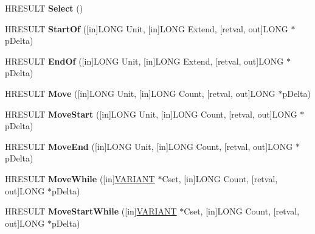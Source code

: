 \begin{DoxyCompactItemize}
\item 
\mbox{\label{interface_i_text_range_abad39848f520cadc0b1e8588868745be}} 
H\+R\+E\+S\+U\+LT {\bfseries Select} ()
\item 
\mbox{\label{interface_i_text_range_a5ff12f1aa1308857f0702a6360b9f11b}} 
H\+R\+E\+S\+U\+LT {\bfseries Start\+Of} (\mbox{[}in\mbox{]}L\+O\+NG Unit, \mbox{[}in\mbox{]}L\+O\+NG Extend, \mbox{[}retval, out\mbox{]}L\+O\+NG $\ast$p\+Delta)
\item 
\mbox{\label{interface_i_text_range_a61b79a35868811004023dd834ff69555}} 
H\+R\+E\+S\+U\+LT {\bfseries End\+Of} (\mbox{[}in\mbox{]}L\+O\+NG Unit, \mbox{[}in\mbox{]}L\+O\+NG Extend, \mbox{[}retval, out\mbox{]}L\+O\+NG $\ast$p\+Delta)
\item 
\mbox{\label{interface_i_text_range_ab5536fe2f6004e37dafb874dbf12096c}} 
H\+R\+E\+S\+U\+LT {\bfseries Move} (\mbox{[}in\mbox{]}L\+O\+NG Unit, \mbox{[}in\mbox{]}L\+O\+NG Count, \mbox{[}retval, out\mbox{]}L\+O\+NG $\ast$p\+Delta)
\item 
\mbox{\label{interface_i_text_range_a990cfe77a6ddc5eaefb55766029d8cc8}} 
H\+R\+E\+S\+U\+LT {\bfseries Move\+Start} (\mbox{[}in\mbox{]}L\+O\+NG Unit, \mbox{[}in\mbox{]}L\+O\+NG Count, \mbox{[}retval, out\mbox{]}L\+O\+NG $\ast$p\+Delta)
\item 
\mbox{\label{interface_i_text_range_a536339da524fc374ce25d9b544e64824}} 
H\+R\+E\+S\+U\+LT {\bfseries Move\+End} (\mbox{[}in\mbox{]}L\+O\+NG Unit, \mbox{[}in\mbox{]}L\+O\+NG Count, \mbox{[}retval, out\mbox{]}L\+O\+NG $\ast$p\+Delta)
\item 
\mbox{\label{interface_i_text_range_a14c433030446898941c0e364f0e78d3d}} 
H\+R\+E\+S\+U\+LT {\bfseries Move\+While} (\mbox{[}in\mbox{]}\hyperlink{structtag_v_a_r_i_a_n_t}{V\+A\+R\+I\+A\+NT} $\ast$Cset, \mbox{[}in\mbox{]}L\+O\+NG Count, \mbox{[}retval, out\mbox{]}L\+O\+NG $\ast$p\+Delta)
\item 
\mbox{\label{interface_i_text_range_a2c91aeab4e0efe62b80f79416a66a8cf}} 
H\+R\+E\+S\+U\+LT {\bfseries Move\+Start\+While} (\mbox{[}in\mbox{]}\hyperlink{structtag_v_a_r_i_a_n_t}{V\+A\+R\+I\+A\+NT} $\ast$Cset, \mbox{[}in\mbox{]}L\+O\+NG Count, \mbox{[}retval, out\mbox{]}L\+O\+NG $\ast$p\+Delta)

\end{DoxyCompactItemize}
